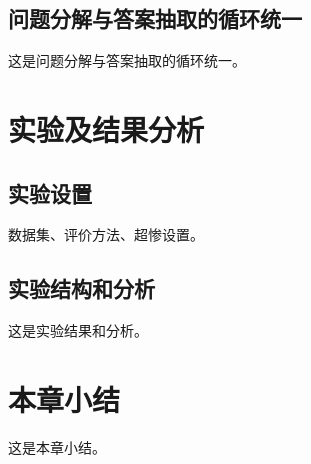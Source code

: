 \subsection{问题分解与答案抽取的循环统一}

这是问题分解与答案抽取的循环统一。


\section{实验及结果分析}

\subsection{实验设置}

数据集、评价方法、超惨设置。

\subsection{实验结构和分析}

这是实验结果和分析。


\section{本章小结}

这是本章小结。


